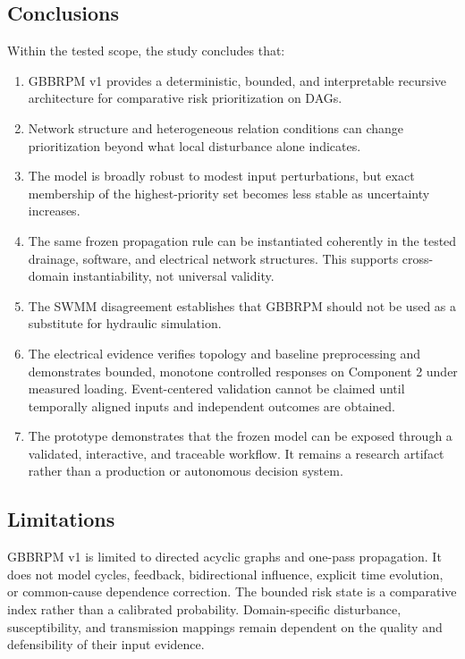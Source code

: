 \subsection{Conclusions}

Within the tested scope, the study concludes that:

\begin{enumerate}[label=\arabic*.,leftmargin=*]
  \item GBBRPM v1 provides a deterministic, bounded, and interpretable
  recursive architecture for comparative risk prioritization on DAGs.
  \item Network structure and heterogeneous relation conditions can
  change prioritization beyond what local disturbance alone indicates.
  \item The model is broadly robust to modest input perturbations, but
  exact membership of the highest-priority set becomes less stable as
  uncertainty increases.
  \item The same frozen propagation rule can be instantiated coherently
  in the tested drainage, software, and electrical network structures.
  This supports cross-domain instantiability, not universal validity.
  \item The SWMM disagreement establishes that GBBRPM should not be used
  as a substitute for hydraulic simulation.
  \item The electrical evidence verifies topology and baseline
  preprocessing and demonstrates bounded, monotone controlled responses
  on Component 2 under measured loading. Event-centered validation cannot
  be claimed until temporally aligned inputs and independent outcomes are
  obtained.
  \item The prototype demonstrates that the frozen model can be exposed
  through a validated, interactive, and traceable workflow. It remains a
  research artifact rather than a production or autonomous decision
  system.
\end{enumerate}

\subsection{Limitations}

GBBRPM v1 is limited to directed acyclic graphs and one-pass propagation.
It does not model cycles, feedback, bidirectional influence, explicit
time evolution, or common-cause dependence correction. The bounded risk
state is a comparative index rather than a calibrated probability.
Domain-specific disturbance, susceptibility, and transmission mappings
remain dependent on the quality and defensibility of their input
evidence.

